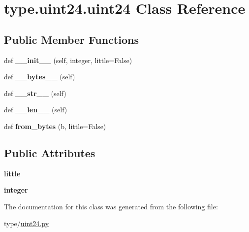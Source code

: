 \hypertarget{classtype_1_1uint24_1_1uint24}{}\section{type.\+uint24.\+uint24 Class Reference}
\label{classtype_1_1uint24_1_1uint24}
\subsection*{Public Member Functions}
\begin{DoxyCompactItemize}
\item 
\mbox{\label{classtype_1_1uint24_1_1uint24_a479599d15597fd18a10e281b5c2e9171}} 
def {\bfseries \+\_\+\+\_\+init\+\_\+\+\_\+} (self, integer, little=False)
\item 
\mbox{\label{classtype_1_1uint24_1_1uint24_ab5204dc782e5d9a7fb53cb62148663b0}} 
def {\bfseries \+\_\+\+\_\+bytes\+\_\+\+\_\+} (self)
\item 
\mbox{\label{classtype_1_1uint24_1_1uint24_ab6e3165a02aa460afb53c93b76b7f0dd}} 
def {\bfseries \+\_\+\+\_\+str\+\_\+\+\_\+} (self)
\item 
\mbox{\label{classtype_1_1uint24_1_1uint24_a78eccf6b01bbe4e51f8c51756b59a5d9}} 
def {\bfseries \+\_\+\+\_\+len\+\_\+\+\_\+} (self)
\item 
\mbox{\label{classtype_1_1uint24_1_1uint24_a4d2294008ffb676f1b81fd699574a9c2}} 
def {\bfseries from\+\_\+bytes} (b, little=False)
\end{DoxyCompactItemize}
\subsection*{Public Attributes}
\begin{DoxyCompactItemize}
\item 
\mbox{\label{classtype_1_1uint24_1_1uint24_a17f058ebcc43659874b9ea25b8655947}} 
{\bfseries little}
\item 
\mbox{\label{classtype_1_1uint24_1_1uint24_a7a731a63fcec5224c68bbf0ac23db47e}} 
{\bfseries integer}
\end{DoxyCompactItemize}


The documentation for this class was generated from the following file\+:\begin{DoxyCompactItemize}
\item 
type/\mbox{\hyperlink{uint24_8py}{uint24.\+py}}\end{DoxyCompactItemize}
